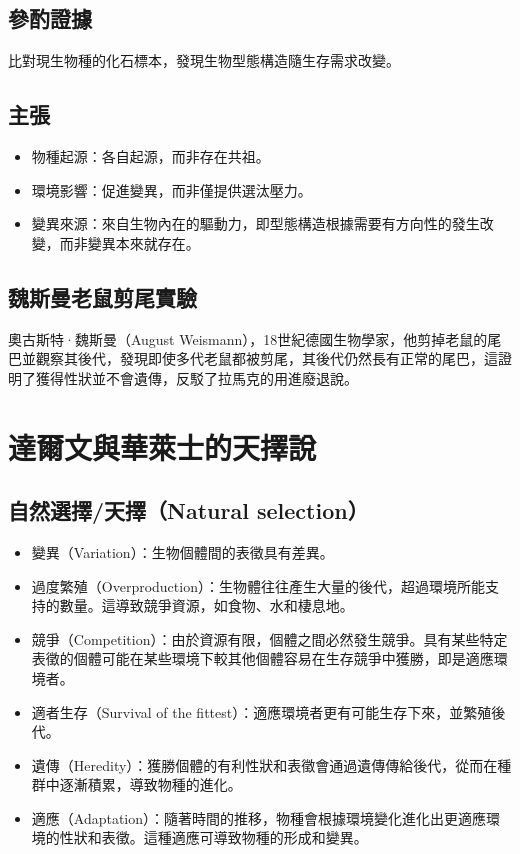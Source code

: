 \documentclass[a4paper,12pt]{report}
\begin{document}
\subsection{參酌證據}
比對現生物種的化石標本，發現生物型態構造隨生存需求改變。
\subsection{主張}
\begin{itemize}
\item 物種起源：各自起源，而非存在共祖。
\item 環境影響：促進變異，而非僅提供選汰壓力。
\item 變異來源：來自生物內在的驅動力，即型態構造根據需要有方向性的發生改變，而非變異本來就存在。
\end{itemize}
\subsection{魏斯曼老鼠剪尾實驗}
奧古斯特·魏斯曼（August Weismann），18世紀德國生物學家，他剪掉老鼠的尾巴並觀察其後代，發現即使多代老鼠都被剪尾，其後代仍然長有正常的尾巴，這證明了獲得性狀並不會遺傳，反駁了拉馬克的用進廢退說。
\section{達爾文與華萊士的天擇說}
\subsection{自然選擇/天擇（Natural selection）}
\begin{itemize}
\item 變異（Variation）：生物個體間的表徵具有差異。
\item 過度繁殖（Overproduction）：生物體往往產生大量的後代，超過環境所能支持的數量。這導致競爭資源，如食物、水和棲息地。
\item 競爭（Competition）：由於資源有限，個體之間必然發生競爭。具有某些特定表徵的個體可能在某些環境下較其他個體容易在生存競爭中獲勝，即是適應環境者。
\item 適者生存（Survival of the fittest）：適應環境者更有可能生存下來，並繁殖後代。
\item 遺傳（Heredity）：獲勝個體的有利性狀和表徵會通過遺傳傳給後代，從而在種群中逐漸積累，導致物種的進化。
\item 適應（Adaptation）：隨著時間的推移，物種會根據環境變化進化出更適應環境的性狀和表徵。這種適應可導致物種的形成和變異。
\end{itemize}
\end{document}
